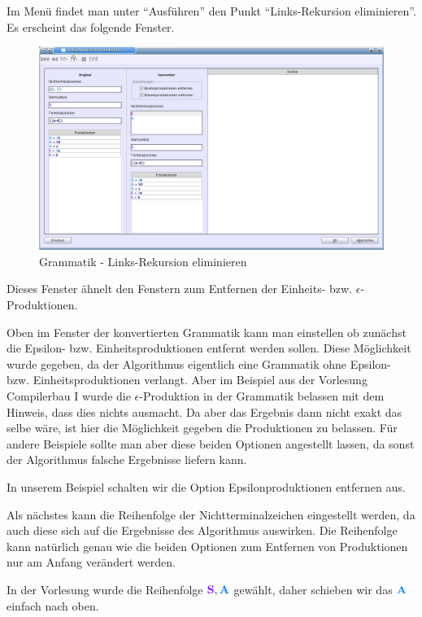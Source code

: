 Im Menü findet man unter "`Ausführen"' den Punkt "`Links-Rekursion eliminieren"'. Es erscheint das folgende Fenster.

\begin{figure}[h]
\begin{center}
\includegraphics[width=12cm]{../images/left_recursion.png}
\caption{Grammatik - Links-Rekursion eliminieren}
\end{center}
\end{figure}

Dieses Fenster ähnelt den Fenstern zum Entfernen der Einheits- bzw. $\epsilon$-Produktionen.

Oben im Fenster der konvertierten Grammatik kann man einstellen ob zunächst die Epsilon- bzw. Einheitsproduktionen entfernt werden sollen. Diese Möglichkeit wurde gegeben, da der Algorithmus eigentlich eine Grammatik ohne Epsilon- bzw. Einheitsproduktionen verlangt. Aber im Beispiel aus der Vorlesung Compilerbau I wurde die $\epsilon$-Produktion in der Grammatik belassen mit dem Hinweis, dass dies nichts ausmacht. Da aber das Ergebnis dann nicht exakt das selbe wäre, ist hier die Möglichkeit gegeben die Produktionen zu belassen. Für andere Beispiele sollte man aber diese beiden Optionen angestellt lassen, da sonst der Algorithmus falsche Ergebnisse liefern kann.

In unserem Beispiel schalten wir die Option Epsilonproduktionen entfernen aus.

Als nächstes kann die Reihenfolge der Nichtterminalzeichen eingestellt werden, da auch diese sich auf die Ergebnisse des Algorithmus auswirken. Die Reihenfolge kann natürlich genau wie die beiden Optionen zum Entfernen von Produktionen nur am Anfang verändert werden.

In der Vorlesung wurde die Reihenfolge $\StartSymbol{S}, \NonterminalSymbol{A}$ gewählt, daher schieben wir das $\NonterminalSymbol{A}$ einfach nach oben.

